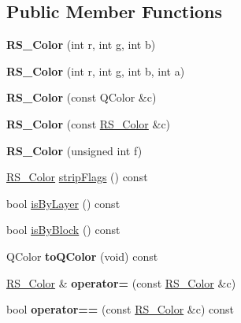 \subsection*{Public Member Functions}
\begin{DoxyCompactItemize}
\item 
\hypertarget{classRS__Color_a67cb642947852508b764fe24faf6941f}{{\bfseries R\-S\-\_\-\-Color} (int r, int g, int b)}\label{classRS__Color_a67cb642947852508b764fe24faf6941f}

\item 
\hypertarget{classRS__Color_a30852ca17622d4b1956a2c196ab03a12}{{\bfseries R\-S\-\_\-\-Color} (int r, int g, int b, int a)}\label{classRS__Color_a30852ca17622d4b1956a2c196ab03a12}

\item 
\hypertarget{classRS__Color_abbc6313f7a0ff964d2b026556492e96d}{{\bfseries R\-S\-\_\-\-Color} (const Q\-Color \&c)}\label{classRS__Color_abbc6313f7a0ff964d2b026556492e96d}

\item 
\hypertarget{classRS__Color_a3448d6fba8759e355de76c5c826e85d5}{{\bfseries R\-S\-\_\-\-Color} (const \hyperlink{classRS__Color}{R\-S\-\_\-\-Color} \&c)}\label{classRS__Color_a3448d6fba8759e355de76c5c826e85d5}

\item 
\hypertarget{classRS__Color_afca132bc479e49fb149ee0c7fa4684f5}{{\bfseries R\-S\-\_\-\-Color} (unsigned int f)}\label{classRS__Color_afca132bc479e49fb149ee0c7fa4684f5}

\item 
\hyperlink{classRS__Color}{R\-S\-\_\-\-Color} \hyperlink{classRS__Color_af1afbe8fa974d959fc761e9050104775}{strip\-Flags} () const 
\item 
bool \hyperlink{classRS__Color_a9ff19dd4aa42140e32801cf386fe16a6}{is\-By\-Layer} () const 
\item 
bool \hyperlink{classRS__Color_a849e4525af328ac882e38d3e209bc1da}{is\-By\-Block} () const 
\item 
\hypertarget{classRS__Color_a0c6964d3edaf0b8fedab38f5780ba2fb}{Q\-Color {\bfseries to\-Q\-Color} (void) const }\label{classRS__Color_a0c6964d3edaf0b8fedab38f5780ba2fb}

\item 
\hypertarget{classRS__Color_a23177e6321dabb0cbe5931d78b5a5542}{\hyperlink{classRS__Color}{R\-S\-\_\-\-Color} \& {\bfseries operator=} (const \hyperlink{classRS__Color}{R\-S\-\_\-\-Color} \&c)}\label{classRS__Color_a23177e6321dabb0cbe5931d78b5a5542}

\item 
\hypertarget{classRS__Color_a3b1f23149671afcdeb41dbd1e351ab36}{bool {\bfseries operator==} (const \hyperlink{classRS__Color}{R\-S\-\_\-\-Color} \&c) const }\label{classRS__Color_a3b1f23149671afcdeb41dbd1e351ab36}

\end{DoxyCompactItemize}
